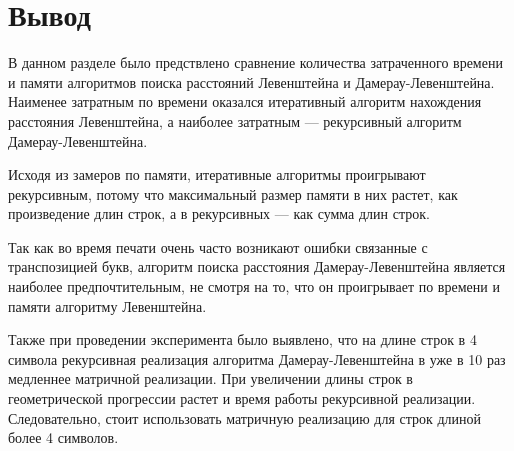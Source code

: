 \section{Вывод}

В данном разделе было предствлено сравнение количества затраченного времени и памяти алгоритмов поиска расстояний Левенштейна и Дамерау-Левенштейна. Наименее затратным по времени оказался итеративный алгоритм нахождения расстояния Левенштейна, а наиболее затратным --- рекурсивный алгоритм Дамерау-Левенштейна.

Исходя из замеров по памяти, итеративные алгоритмы проигрывают рекурсивным, потому что максимальный размер памяти в них растет, как произведение длин строк, а в рекурсивных --- как сумма длин строк.

Так как во время печати очень часто возникают ошибки связанные с транспозицией букв, алгоритм поиска расстояния Дамерау-Левенштейна является наиболее предпочтительным, не смотря на то, что он проигрывает по времени и памяти алгоритму Левенштейна.

Также при проведении эксперимента было выявлено, что на длине строк в 4 символа рекурсивная реализация алгоритма Дамерау-Левенштейна в уже в 10 раз медленнее матричной реализации. При увеличении длины строк в геометрической прогрессии растет и время работы рекурсивной реализации. Следовательно, стоит использовать матричную реализацию для строк длиной более 4 символов.

